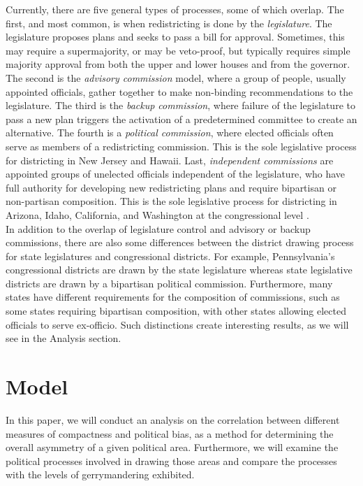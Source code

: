 \documentclass[12pt]{article}
\begin{document}
Currently, there are five general types of processes, some of which overlap.  The first, and most common, is when redistricting is done by the \textit{legislature}.    The legislature proposes plans and seeks to pass a bill for approval.  Sometimes, this may require a supermajority, or may be veto-proof, but typically requires simple majority approval from both the upper and lower houses and from the governor.  The second is the \textit{advisory commission} model, where a group of people, usually appointed officials, gather together to make non-binding recommendations to the legislature.  The third is the \textit{backup commission}, where failure of the legislature to pass a new plan triggers the activation of a predetermined committee to create an alternative.  The fourth is a \textit{political commission}, where elected officials often serve as members of a redistricting commission.  This is the sole legislative process for districting in New Jersey and Hawaii.  Last, \textit{independent commissions} are appointed groups of unelected officials independent of the legislature, who have full authority for developing new redistricting plans and require bipartisan or non-partisan composition.  This is the sole legislative process for districting in Arizona, Idaho, California, and Washington at the congressional level \cite{Levitt}. \\

In addition to the overlap of legislature control and advisory or backup commissions, there are also some differences between the district drawing process for state legislatures and congressional districts.  For example, Pennsylvania's congressional districts are drawn by the state legislature whereas state legislative districts are drawn by a bipartisan political commission.  Furthermore, many states have different requirements for the composition of commissions, such as some states requiring bipartisan composition, with other states allowing elected officials to serve ex-officio.  Such distinctions create interesting results, as we will see in the Analysis section.

  \section{Model}
  In this paper, we will conduct an analysis on the correlation between different measures of compactness and political bias, as a method for determining the overall asymmetry of a given political area.  Furthermore, we will examine the political processes involved in drawing those areas and compare the processes with the levels of gerrymandering exhibited.\\
  
\end{document}
